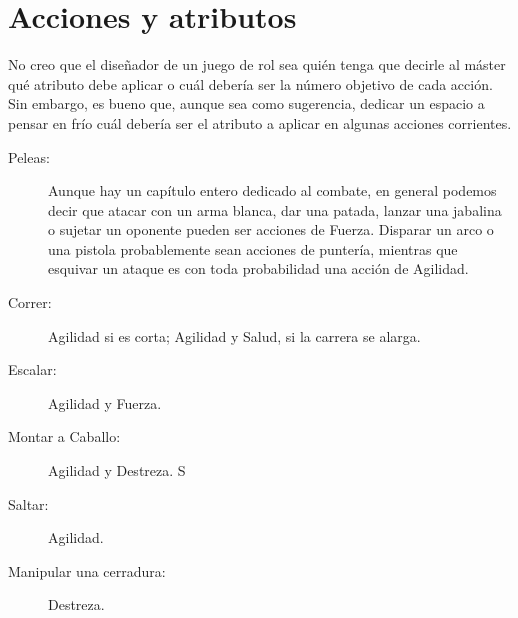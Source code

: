 \section{Acciones y atributos}

No creo que el diseñador de un juego de rol sea quién tenga que decirle al máster qué atributo debe aplicar o cuál debería ser la número objetivo de cada acción. Sin embargo, es bueno que, aunque sea como sugerencia, dedicar un espacio a pensar en frío cuál debería ser el atributo a aplicar en algunas acciones corrientes.


\begin{description}


\item[Peleas:] Aunque hay un capítulo entero dedicado al combate, en general podemos decir que atacar con un arma blanca, dar una patada, lanzar una jabalina o sujetar un oponente pueden ser acciones de Fuerza. Disparar un arco o una pistola probablemente sean acciones de puntería, mientras que esquivar un ataque es con toda probabilidad una acción de Agilidad. 

\item[Correr:] Agilidad si es corta; Agilidad y Salud, si la carrera se alarga.

\item[Escalar:] Agilidad y Fuerza.

\item[Montar a Caballo:] Agilidad y Destreza. S

\item[Saltar:] Agilidad.

\item[Manipular una cerradura:] Destreza.

\end{description}


